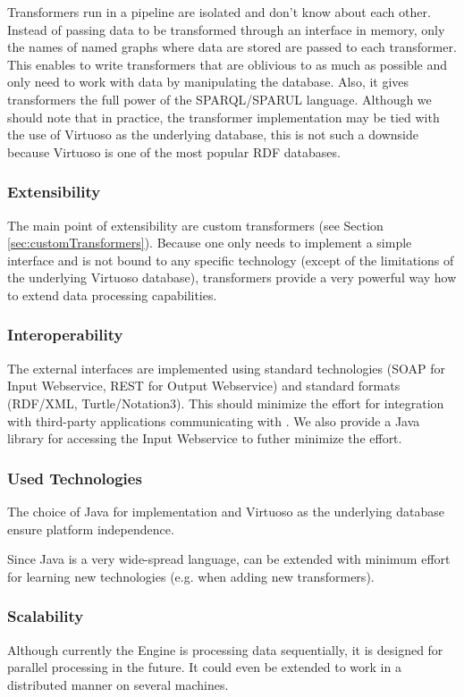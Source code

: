 Transformers run in a pipeline are isolated and don't know about each other. Instead of passing data to be transformed through an interface in memory, only the names of named graphs where data are stored are passed to each transformer. This enables to write transformers that are oblivious to \odcs as much as possible and only need to work with data by manipulating the database. Also, it gives transformers the full power of the SPARQL/SPARUL language. Although we should note that in practice, the transformer implementation may be tied with the use of Virtuoso as the underlying database, this is not such a downside because Virtuoso is one of the most popular RDF databases.

\subsubsection{Extensibility}
The main point of extensibility are custom transformers (see Section \ref{sec:customTransformers}). Because one only needs to implement a simple interface and is not bound to any specific technology (except of the limitations of the underlying Virtuoso database), transformers provide a very powerful way how to extend data processing capabilities.

\subsubsection{Interoperability}
The external interfaces are implemented using standard technologies (SOAP for Input Webservice, REST for Output Webservice) and standard formats (RDF/XML, Turtle/Notation3). This should minimize the effort for integration with third-party applications communicating with \odcs. We also provide a Java library for accessing the Input Webservice to futher minimize the effort.

\subsubsection{Used Technologies}
The choice of Java for implementation and Virtuoso as the underlying database ensure platform independence.

Since Java is a very wide-spread language, \odcs can be extended with minimum effort for learning new technologies (e.g. when adding new transformers).

\subsubsection{Scalability}
 Although currently the Engine is processing data sequentially, it is designed for parallel processing in the future. It could even be extended to work in a distributed manner on several machines.

